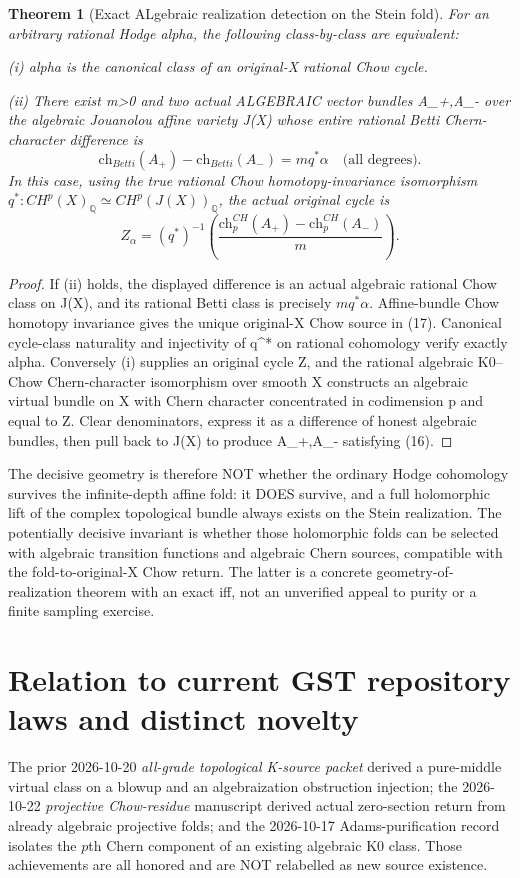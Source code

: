 \documentclass[11pt]{article}
\newtheorem{theorem}{Theorem}
\begin{document}
\begin{theorem}[Exact ALgebraic realization detection on the Stein fold]
For an arbitrary rational Hodge alpha,
the following class-by-class are equivalent:

(i) alpha is the canonical class of an
original-X rational Chow cycle.

(ii) There exist m>0 and two actual
ALGEBRAIC vector bundles A_+,A_- over the
algebraic Jouanolou affine variety J(X)
whose entire rational Betti Chern-character
difference is
\[
  \boxed{\mathrm{ch}_{Betti}(A_+)-\mathrm{ch}_{Betti}(A_-)
      =m q^*\alpha \quad\text{(all degrees).}}    \tag{16}
\]
In this case, using the true rational Chow
homotopy-invariance isomorphism
$q^*:CH^p(X)_{\mathbb Q}\simeq
 CH^p(J(X))_{\mathbb Q}$,
the actual original cycle is
\[
 \boxed{
 Z_\alpha=(q^*)^{-1}
    \left(\frac{\mathrm{ch}^{CH}_p(A_+)
                   -\mathrm{ch}^{CH}_p(A_-)}{m}\right).
 }                                                        \tag{17}
\]
\end{theorem}
\begin{proof}
If (ii) holds, the displayed difference
is an actual algebraic rational Chow class
on J(X), and its rational Betti class
is precisely $m q^*\alpha$.
Affine-bundle Chow homotopy invariance
gives the unique original-X Chow source
in (17). Canonical cycle-class
naturality and injectivity of q^* on
rational cohomology verify exactly alpha.
Conversely (i) supplies an original
cycle Z, and the rational algebraic
K0--Chow Chern-character isomorphism
over smooth X constructs an algebraic
virtual bundle on X with Chern character
concentrated in codimension p and equal
to Z. Clear denominators, express it
as a difference of honest algebraic
bundles, then pull back to J(X) to
produce A_+,A_- satisfying (16).
\end{proof}

The decisive geometry is therefore NOT
whether the ordinary Hodge cohomology
survives the infinite-depth affine fold:
it DOES survive, and a full holomorphic
lift of the complex topological bundle
always exists on the Stein realization.
The potentially decisive invariant is
whether those holomorphic folds can be
selected with algebraic transition
functions and algebraic Chern sources,
compatible with the fold-to-original-X
Chow return. The latter is a concrete
geometry-of-realization theorem with
an exact iff, not an unverified appeal
to purity or a finite sampling
exercise.

\section{Relation to current GST repository laws and distinct novelty}
The prior 2026-10-20 \emph{all-grade topological K-source
packet} derived a pure-middle virtual class on a
blowup and an algebraization obstruction injection;
the 2026-10-22 \emph{projective Chow-residue}
manuscript derived actual zero-section return from
already algebraic projective folds; and the
2026-10-17 Adams-purification record isolates the
$p$th Chern component of an existing algebraic K0
class. Those achievements are all honored and
are NOT relabelled as new source existence.
\end{document}
